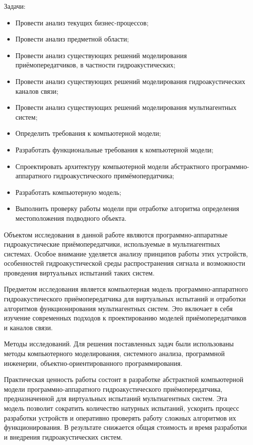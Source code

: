\documentclass[
    numbers=section,
    document-code={ВКРБ--09.03.04--10.19--XX--26--81}
]{../latex/fqw}
\begin{document}
    Задачи:
    \begin{itemize}
        \item Провести анализ текущих бизнес-процессов;
        \item Провести анализ предметной области;
        \item Провести анализ существующих решений моделирования приёмопередатчиков, в частности гидроакустических;
        \item Провести анализ существующих решений моделирования гидроакустических каналов связи;
        \item Провести анализ существующих решений моделирования мультиагентных систем;
        \item Определить требования к компьютерной модели;
        \item Разработать функциональные требования к компьютерной модели;
        \item Спроектировать архитектуру компьютерной модели абстрактного программно-аппаратного гидроакустического
        примёмопердатчика;
        \item Разработать компьютерную модель;
        \item Выполнить проверку работы модели при отработке алгоритма определения местоположения подводного объекта.
    \end{itemize}

    Объектом исследования в данной работе являются программно-аппаратные гидроакустические приёмопередатчики,
    используемые в мультиагентных системах.
    Особое внимание уделяется анализу принципов работы этих устройств,
    особенностей гидроакустической среды распространения сигнала
    и возможности проведения виртуальных испытаний таких систем.

    Предметом исследования является компьютерная модель программно-аппаратного гидроакустического приёмопередатчика для
    виртуальных испытаний и отработки алгоритмов функционирования мультиагентных систем.
    Это включает в себя изучение современных подходов к проектированию моделей приёмопередатчиков и каналов связи.

    Методы исследований.
    Для решения поставленных задач были использованы методы
    компьютерного моделирования,
    системного анализа,
    программной инженерии,
    объектно-ориентированного программирования.

    Практическая ценность работы состоит в разработке
    абстрактной компьютерной модели программно-аппаратного гидроакустического приёмопередатчика,
    предназначенной для виртуальных испытаний мультиагентных систем.
    Эта модель позволит
    сократить количество натурных испытаний,
    ускорить процесс разработки устройств и
    оперативно проверять работу сложных алгоритмов их функционирования.
    В результате снижается общая стоимость и время разработки и внедрения гидроакустических систем.
\end{document}
